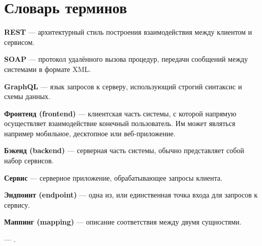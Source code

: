 \chapter*{Словарь терминов}             %

\textbf{REST} --- архитектурный стиль построения взаимодействия между клиентом и сервисом.

\textbf{SOAP} --- протокол удалённого вызова процедур, передачи сообщений между системами в формате XML\@.

\textbf{GraphQL} --- язык запросов к серверу, использующий строгий синтаксис и схемы данных.

\textbf{Фронтенд (frontend)} --- клиентская часть системы, с которой напрямую осуществляет взаимодействие конечный пользователь.
Им может являться например мобильное, десктопное или веб-приложение.

\textbf{Бэкенд (backend)} --- серверная часть системы, обычно представляет собой набор сервисов.

\textbf{Сервис} --- серверное приложение, обрабатывающее запросы клиента.

\textbf{Эндпоинт (endpoint)} --- одна из, или единственная точка входа для запросов к сервису.

\textbf{Маппинг (mapping)} --- описание соответствия между двумя сущностями.

\textbf{} --- .

